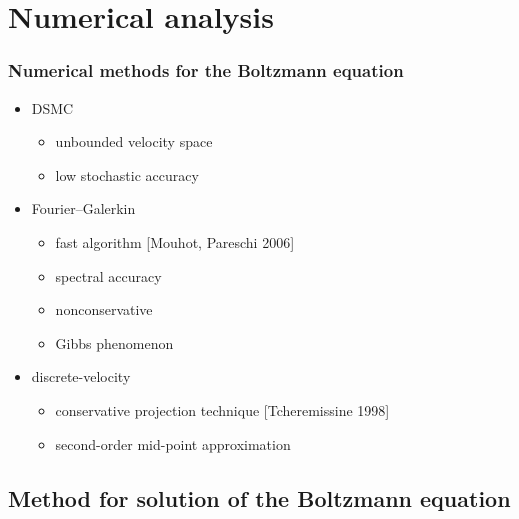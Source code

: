 \documentclass[mathserif]{beamer} %
\newcommand\pro{\item[$+$]}
\newcommand\con{\item[$-$]}
\begin{document}
\section{Numerical analysis}

\begin{frame}
    \frametitle{Numerical methods for the Boltzmann equation}
    \begin{itemize}
        \item DSMC
        \begin{itemize}
            \pro unbounded velocity space
            \con low stochastic accuracy
        \end{itemize}
        \item Fourier--Galerkin
        \begin{itemize}
            \pro fast algorithm [Mouhot, Pareschi 2006]
            \pro spectral accuracy
            \con nonconservative
            \con Gibbs phenomenon
        \end{itemize}
        \item discrete-velocity
        \begin{itemize}
            \pro conservative projection technique [Tcheremissine 1998]
            \item second-order mid-point approximation
        \end{itemize}
    \end{itemize}
\end{frame}

\subsection{Method for solution of the Boltzmann equation}
\end{document}

